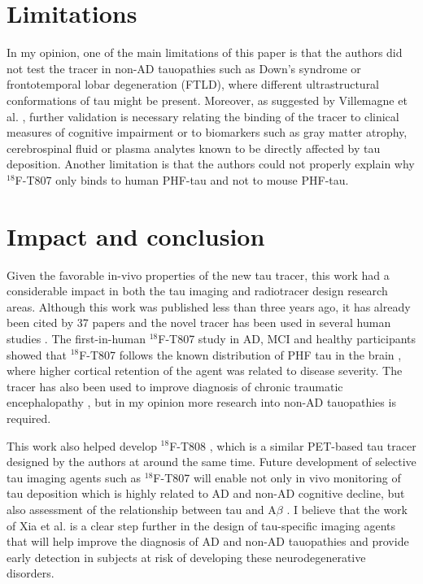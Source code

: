 \documentclass[11pt,a4paper,oneside]{report}
\begin{document}
\section*{Limitations}

In my opinion, one of the main limitations of this paper is that the authors did not test the tracer in non-AD tauopathies such as Down's syndrome or frontotemporal lobar degeneration (FTLD), where different ultrastructural conformations of tau might be present. Moreover, as suggested by Villemagne et al. \cite{villemagne2014vivo}, further validation is necessary relating the binding of the tracer to clinical measures of cognitive impairment or to biomarkers such as gray matter atrophy, cerebrospinal fluid or plasma analytes known to be directly affected by tau deposition.  Another limitation is that the authors could not properly explain why $^{18}$F-T807 only binds to human PHF-tau and not to mouse PHF-tau. 


\section*{Impact and conclusion}

Given the favorable in-vivo properties of the new tau tracer, this work had a considerable impact in both the tau imaging and radiotracer design research areas. Although this work was published less than three years ago, it has already been cited by 37 papers and the novel tracer has been used in several human studies \cite{chien2012early,mitsis2014tauopathy}.  The first-in-human $^{18}$F-T807 study in AD, MCI and healthy participants showed that $^{18}$F-T807 follows the known distribution of PHF tau in the brain \cite{chien2012early}, where higher cortical retention of the agent was related to disease severity. \cite{villemagne2014vivo} The tracer has also been used to improve diagnosis of chronic traumatic encephalopathy \cite{mitsis2014tauopathy}, but in my opinion more research into non-AD tauopathies is required.

This work also helped develop $^{18}$F-T808 \cite{zhang2011highly}, which is a similar PET-based tau tracer designed by the authors at around the same time. Future development of selective tau imaging agents such as $^{18}$F-T807 will enable not only in vivo monitoring of tau deposition which is highly related to AD and non-AD cognitive decline, but also assessment of the relationship between tau and A$\beta$ \cite{villemagne2014vivo, fodero201118f, chien2012early, jack2010hypothetical}. I believe that the work of Xia et al. \cite{xia201318} is a clear step further in the design of tau-specific imaging agents that will help improve the diagnosis of AD and non-AD tauopathies and provide early detection in subjects at risk of developing these neurodegenerative disorders.


\nocite{*} %


\end{document}
